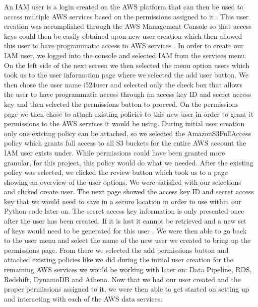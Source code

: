 An IAM user is a login created on the AWS platform that can then be used to 
access multiple AWS services based on the permissions assigned to 
it \cite{hid-sp18-521-IAMOverview}. This user creation was accomplished 
through the AWS Management Console so that access keys could then be easily 
obtained upon new user creation which then allowed this user to have 
programmatic access to AWS services \cite{hid-sp18-521-IAMkeys}. In order to 
create our IAM user, we logged into the console and selected IAM from the 
services menu. On the left side of the next screen we then selected the menu 
option users which took us to the user information page where we selected the 
add user button. We then chose the user name i524user and selected only the 
check box that allows the user to have programmatic access through an access 
key ID and secret access key and then selected the permissions button to 
proceed. On the permissions page we then chose to attach existing policies to 
this new user in order to grant it permissions to the AWS services it would be 
using. During initial user creation only one existing policy can be attached, 
so we selected the AmazonS3FullAccess policy which grants full access to all 
S3 buckets for the entire AWS account the IAM user exists under. While 
permissions could have been granted more granular, for this project, this 
policy would do what we needed. After the existing policy was selected, we 
clicked the review button which took us to a page showing an overview of the 
user options. We were satisfied with our selections and clicked create user. 
The next page showed the access key ID and secret access key that we would 
need to save in a secure location in order to use within our Python code later 
on. The secret access key information is only presented once after the user 
has been created. If it is lost it cannot be retrieved and a new set of keys 
would need to be generated for this user \cite{hid-sp18-521-IAMkeys}. We were 
then able to go back to the user menu and select the name of the new user we 
created to bring up the permissions page. From there we selected the add 
permissions button and attached existing policies like we did during the 
initial user creation for the remaining AWS services we would be working with 
later on: Data Pipeline, RDS, Redshift, DynamoDB and Athena. Now that we had 
our user created and the proper permissions assigned to it, we were then able 
to get started on setting up and interacting with each of the AWS data 
services. 

